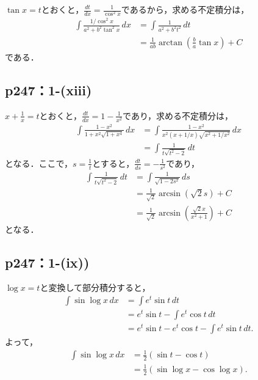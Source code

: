 \documentclass[uplatex,dvipdfmx,a4paper,10pt,fleqn]{jsarticle}
\begin{document}
\begin{tleftbar}
    $\tan x = t$とおくと，$\frac{dt}{dx}= \frac{1}{\cos ^2 x}$であるから，求める不定積分は，
    \begin{align*} 
        \int \frac{1/\cos ^2 x}{a^2 + b^2 \tan ^2 x} \, dx & = \int \frac{1}{a^2+b^2 t^2} \, dt \\
        & = \frac{1}{ab} \arctan \left (\frac{b}{a} \tan x \right)+ C
    \end{align*}
    である．
\end{tleftbar}


\subsection*{p247：1-(xiii)}


\begin{tleftbar}
    $x+\frac{1}{x}=t$とおくと，$\frac{dt}{dx}=1-\frac{1}{x^2}$であり，求める不定積分は，
    \begin{align*} 
        \int \frac{1-x^2}{1+x^2\sqrt{1+x^4}} \, dx & = \int \frac{1-x^2}{x^2 (x+1/x)\sqrt{x^2 + 1/x^2}} \, dx \\
        & =\int \frac{1}{t\sqrt{t^2-2}} \, dt
    \end{align*}
    となる．ここで，$s=\frac{1}{t}$とすると，$\frac{dt}{ds}=-\frac{1}{s^2}$であり，
    \begin{align*} 
        \int \frac{1}{t \sqrt{t^2-2}} \, dt & = \int \frac{1}{\sqrt{1-2s^2}} \, ds \\
        & = \frac{1}{\sqrt{2}} \arcsin (\sqrt{2}s)+C \\
        & = \frac{1}{\sqrt{2}} \arcsin \left (\frac{\sqrt{2}x}{x^2+1} \right)+C
    \end{align*}
    となる．
\end{tleftbar}


\subsection*{p247：1-(ix))}
\begin{leftbar}
    $\log x = t$と変換して部分積分すると，
    \begin{align*}
      \int \sin \log x \,dx
      &= \int e^t \sin t \,dt \\
      &= e^t \sin t - \int e^t \cos t \,dt \\
      &= e^t \sin t - e^t \cos t - \int e^t \sin t \,dt.
    \end{align*}
    よって，
    \begin{align*}
      \int \sin \log x \,dx
      &= \frac{1}{2}(\sin t - \cos t) \\
      &= \frac{1}{2}(\sin \log x - \cos \log x).
    \end{align*}
  \end{leftbar}
\end{document}

